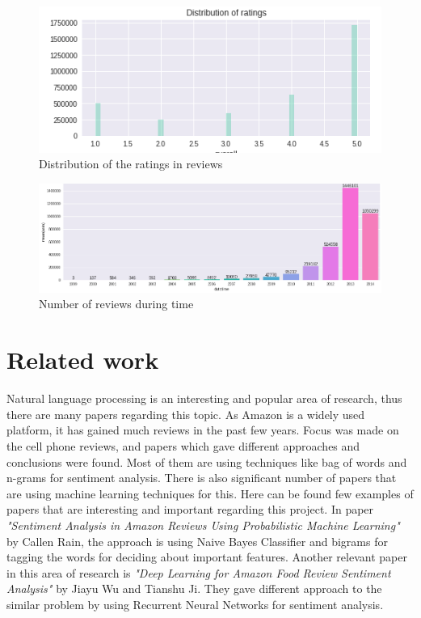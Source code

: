 \documentclass[11pt]{article}
\begin{document}
  
  
  
  \begin{figure}[h!]
    \centering
      \includegraphics[width=\linewidth]{ratingDistribution.png}
    \caption{Distribution of the ratings in reviews}
    \label{fig:ratingDistribution}
  \end{figure}
  
  
  \begin{figure}[h!]
    \centering
      \includegraphics[width=\linewidth]{reviewsByTime.png}
    \caption{Number of reviews during time}
    \label{fig:reviewsByTime}
  \end{figure}
  
  
  \section{Related work}
  Natural language processing is an interesting and popular area of research, thus there are many papers regarding this topic. As Amazon is a widely used platform, it has gained much reviews in the past few years. Focus was made on the cell phone reviews, and papers which gave different approaches and conclusions were found. Most of them are using techniques like bag of words and n-grams for sentiment analysis. There is also significant number of papers that are using machine learning techniques for this. Here can be found few examples of papers that are interesting and important regarding this project. In paper \textit{"Sentiment Analysis in Amazon Reviews Using Probabilistic Machine Learning"} by Callen Rain, the approach is using Naive Bayes Classifier and bigrams for tagging the words for deciding about important features. Another relevant paper in this area of research is \textit{"Deep Learning for Amazon Food Review Sentiment Analysis"} by Jiayu Wu and Tianshu Ji. They gave different approach to the similar problem by using Recurrent Neural Networks for sentiment analysis. 
  
\end{document}
